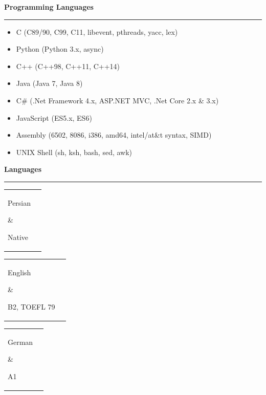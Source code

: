 \documentclass[11pt,a4paper,oneside]{article}
\makeatletter
\renewcommand{\section}[1]{%
{\large\textbf{#1}}\\
\rule[9pt]{18cm}{.4pt}\vspace{-16pt}%
}
\newenvironment{mytable}{%
\begin{tabular}{@{}l@{\hspace{4mm}}l@{}}%
}{\end{tabular}}
\newcommand{\myitem}[2]{%
\parbox[t]{16mm}{#1}&\parbox[t]{16cm}{#2}\\%
}
\makeatother
\begin{document}
\section{Programming Languages}
\begin{itemize}
\item C (C89/90, C99, C11, libevent, pthreads, yacc, lex)
\item Python (Python 3.x, async)
\item C++ (C++98, C++11, C++14)
\item Java (Java 7, Java 8)
\item C\# (.Net Framework 4.x, ASP.NET MVC, .Net Core 2.x \& 3.x)
\item JavaScript (ES5.x, ES6)
\item Assembly (6502, 8086, i386, amd64, intel/at\&t syntax, SIMD)
\item UNIX Shell (sh, ksh, bash, sed, awk)
\end{itemize}

\section{Languages}

\begin{mytable}\myitem{Persian}{
	Native
}\end{mytable}

\begin{mytable}\myitem{English}{
	B2, TOEFL 79
}\end{mytable}

\begin{mytable}\myitem{German}{
	A1
}\end{mytable}
\end{document}
